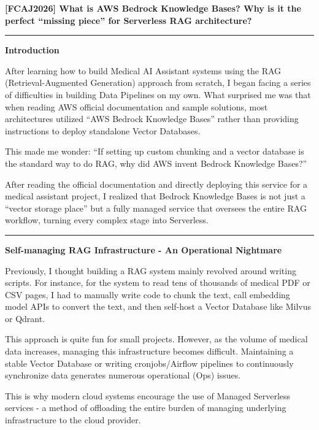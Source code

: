 \vspace{0.5em}\noindent\textbf{{[}FCAJ2026{]} What is AWS Bedrock Knowledge Bases? Why is it
the perfect ``missing piece'' for Serverless RAG architecture?}

\begin{center}\rule{0.5\linewidth}{0.5pt}\end{center}

\vspace{0.5em}\noindent\textbf{Introduction}

After learning how to build Medical AI Assistant systems using the RAG
(Retrieval-Augmented Generation) approach from scratch, I began facing a
series of difficulties in building Data Pipelines on my own. What
surprised me was that when reading AWS official documentation and sample
solutions, most architectures utilized ``AWS Bedrock Knowledge Bases''
rather than providing instructions to deploy standalone Vector
Databases.

This made me wonder: ``If setting up custom chunking and a vector
database is the standard way to do RAG, why did AWS invent Bedrock
Knowledge Bases?''

After reading the official documentation and directly deploying this
service for a medical assistant project, I realized that Bedrock
Knowledge Bases is not just a ``vector storage place'' but a fully
managed service that oversees the entire RAG workflow, turning every
complex stage into Serverless.

\begin{center}\rule{0.5\linewidth}{0.5pt}\end{center}

\vspace{0.5em}\noindent\textbf{Self-managing RAG Infrastructure - An Operational
Nightmare}

Previously, I thought building a RAG system mainly revolved around
writing scripts. For instance, for the system to read tens of thousands
of medical PDF or CSV pages, I had to manually write code to chunk the
text, call embedding model APIs to convert the text, and then self-host
a Vector Database like Milvus or Qdrant.

This approach is quite fun for small projects. However, as the volume of
medical data increases, managing this infrastructure becomes difficult.
Maintaining a stable Vector Database or writing cronjobs/Airflow
pipelines to continuously synchronize data generates numerous
operational (Ops) issues.

This is why modern cloud systems encourage the use of Managed Serverless
services - a method of offloading the entire burden of managing
underlying infrastructure to the cloud provider.


